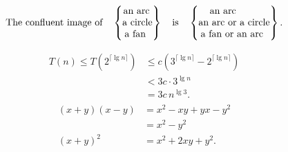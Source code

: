 
$$\hbox{The confluent image of}\quad
\begin{Bmatrix}\hbox{an arc}\hfill\\\hbox{a circle}\hfill\\
\hbox{a fan}\hfill\\\end{Bmatrix}
\quad\hbox{is}\quad
\begin{Bmatrix}\hbox{an arc}\hfill\\
\hbox{an arc or a circle}\hfill\\
\hbox{a fan or an arc}\hfill\end{Bmatrix}.$$
\egroup

\framebreak

\begin{align*}
T(n)\le T(2^{\lceil\lg n\rceil})
&\le c(3^{\lceil\lg n\rceil}-2^{\lceil\lg n\rceil})\\
&<3c\cdot3^{\lg n}\\
&=3c\,n^{\lg3}.
\end{align*}
\begin{align*}
\begin{aligned}
(x+y)(x-y)&=x^2-xy+yx-y^2\\
&=x^2-y^2\\
(x+y)^2&=x^2+2xy+y^2.
\end{aligned}
\end{align*}

\framebreak

